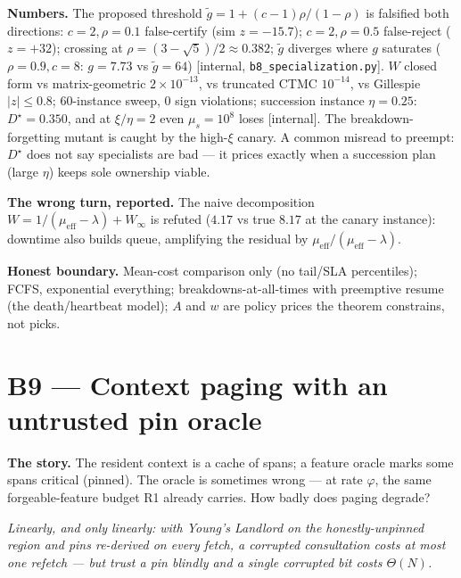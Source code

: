 \documentclass[11pt,a4paper]{article}
\newcommand{\onebreath}[1]{\begin{center}\emph{#1}\end{center}}
\begin{document}
\textbf{Numbers.} The proposed threshold $\tilde g = 1+(c{-}1)\rho/(1{-}\rho)$ is falsified both directions: $c{=}2,\rho{=}0.1$ false-certify (sim $z=-15.7$); $c{=}2,\rho{=}0.5$ false-reject ($z=+32$); crossing at $\rho=(3-\sqrt5)/2\approx0.382$; $\tilde g$ diverges where $g$ saturates ($\rho{=}0.9,c{=}8$: $g=7.73$ vs $\tilde g=64$) [internal, \texttt{b8\_specialization.py}]. $W$ closed form vs matrix-geometric $2{\times}10^{-13}$, vs truncated CTMC $10^{-14}$, vs Gillespie $|z|\le0.8$; 60-instance sweep, 0 sign violations; succession instance $\eta=0.25$: $D^\star=0.350$, and at $\xi/\eta=2$ even $\mu_s=10^8$ loses [internal]. The breakdown-forgetting mutant is caught by the high-$\xi$ canary. A common misread to preempt: $D^\star$ does not say specialists are bad --- it prices exactly when a succession plan (large $\eta$) keeps sole ownership viable.

\textbf{The wrong turn, reported.} The naive decomposition $W = 1/(\mu_{\mathrm{eff}}-\lambda) + W_\infty$ is refuted ($4.17$ vs true $8.17$ at the canary instance): downtime also builds queue, amplifying the residual by $\mu_{\mathrm{eff}}/(\mu_{\mathrm{eff}}-\lambda)$.

\begin{boundary}
\textbf{Honest boundary.} Mean-cost comparison only (no tail/SLA percentiles); FCFS, exponential everything; breakdowns-at-all-times with preemptive resume (the death/heartbeat model); $A$ and $w$ are policy prices the theorem constrains, not picks.
\end{boundary}

\section{B9 --- Context paging with an untrusted pin oracle}\label{sec:b9}
\textbf{The story.} The resident context is a cache of spans; a feature oracle marks some spans critical (pinned). The oracle is sometimes wrong --- at rate $\varphi$, the same forgeable-feature budget R1 already carries. How badly does paging degrade?

\onebreath{Linearly, and only linearly: with Young's Landlord on the honestly-unpinned region and pins re-derived on every fetch, a corrupted consultation costs at most one refetch --- but trust a pin blindly and a single corrupted bit costs $\Theta(N)$.}
\end{document}

